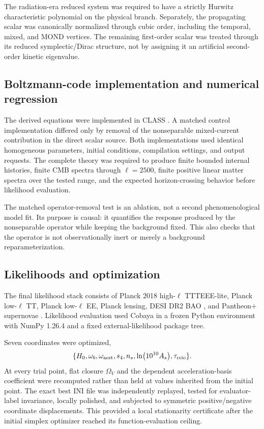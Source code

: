 The radiation-era reduced system was required to have a strictly Hurwitz characteristic polynomial on the physical branch. Separately, the propagating scalar was canonically normalized through cubic order, including the temporal, mixed, and MOND vertices. The remaining first-order scalar was treated through its reduced symplectic/Dirac structure, not by assigning it an artificial second-order kinetic eigenvalue.

\subsection{Boltzmann-code implementation and numerical regression}
The derived equations were implemented in CLASS \cite{Lesgourgues2011CLASS,Blas2011CLASS}. A matched control implementation differed only by removal of the nonseparable mixed-current contribution in the direct scalar source. Both implementations used identical homogeneous parameters, initial conditions, compilation settings, and output requests. The complete theory was required to produce finite bounded internal histories, finite CMB spectra through $\ell=2500$, finite positive linear matter spectra over the tested range, and the expected horizon-crossing behavior before likelihood evaluation.

The matched operator-removal test is an ablation, not a second phenomenological model fit. Its purpose is causal: it quantifies the response produced by the nonseparable operator while keeping the background fixed. This also checks that the operator is not observationally inert or merely a background reparameterization.

\subsection{Likelihoods and optimization}
The final likelihood stack consists of Planck 2018 high-$\ell$ TTTEEE-lite, Planck low-$\ell$ TT, Planck low-$\ell$ EE, Planck lensing, DESI DR2 BAO \cite{DESIDR2II2025}, and Pantheon+ supernovae \cite{Brout2022,Scolnic2022}. Likelihood evaluation used Cobaya \cite{TorradoLewis2021} in a frozen Python environment with NumPy 1.26.4 and a fixed external-likelihood package tree.

Seven coordinates were optimized,
\begin{equation}
\{H_0,\omega_b,\omega_{\rm aest},s_4,n_s,\ln(10^{10}A_s),\tau_{\rm reio}\}.
\end{equation}
At every trial point, flat closure $\Omega_V$ and the dependent acceleration-basis coefficient were recomputed rather than held at values inherited from the initial point. The exact best INI file was independently replayed, tested for evaluator-label invariance, locally polished, and subjected to symmetric positive/negative coordinate displacements. This provided a local stationarity certificate after the initial simplex optimizer reached its function-evaluation ceiling.

